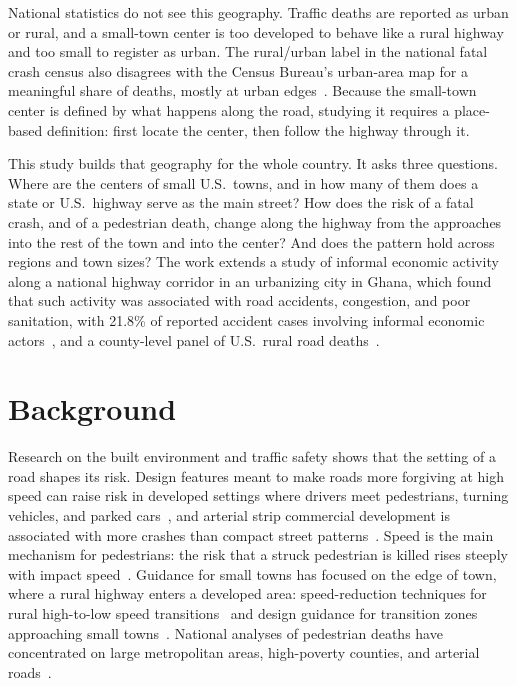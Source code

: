 \documentclass[11pt,letterpaper]{article}
\begin{document}
National statistics do not see this geography. Traffic deaths are reported as urban or rural, and a small-town center is too developed to behave like a rural highway and too small to register as urban. The rural/urban label in the national fatal crash census also disagrees with the Census Bureau's urban-area map for a meaningful share of deaths, mostly at urban edges~\cite{nani2026a}. Because the small-town center is defined by what happens along the road, studying it requires a place-based definition: first locate the center, then follow the highway through it.

This study builds that geography for the whole country. It asks three questions. Where are the centers of small U.S.\ towns, and in how many of them does a state or U.S.\ highway serve as the main street? How does the risk of a fatal crash, and of a pedestrian death, change along the highway from the approaches into the rest of the town and into the center? And does the pattern hold across regions and town sizes? The work extends a study of informal economic activity along a national highway corridor in an urbanizing city in Ghana, which found that such activity was associated with road accidents, congestion, and poor sanitation, with 21.8\% of reported accident cases involving informal economic actors~\cite{nani2025}, and a county-level panel of U.S.\ rural road deaths~\cite{panel}.

\section{Background}
Research on the built environment and traffic safety shows that the setting of a road shapes its risk. Design features meant to make roads more forgiving at high speed can raise risk in developed settings where drivers meet pedestrians, turning vehicles, and parked cars~\cite{ewing}, and arterial strip commercial development is associated with more crashes than compact street patterns~\cite{dumbaugh}. Speed is the main mechanism for pedestrians: the risk that a struck pedestrian is killed rises steeply with impact speed~\cite{tefft}. Guidance for small towns has focused on the edge of town, where a rural highway enters a developed area: speed-reduction techniques for rural high-to-low speed transitions~\cite{forbes} and design guidance for transition zones approaching small towns~\cite{torbic}. National analyses of pedestrian deaths have concentrated on large metropolitan areas, high-poverty counties, and arterial roads~\cite{ghsa,sga}.
\end{document}
